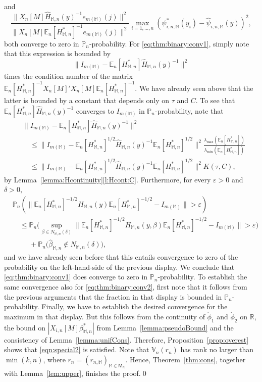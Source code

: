 \documentclass[preprint]{imsart}
\newcommand{\R}{{\mathbb R}}
\newcommand{\E}{{\mathbb E}}
\newcommand{\VC}{{\mathbb{V}}}
\renewcommand{\P}{{\mathbb P}}
\newcommand{\eps}{\varepsilon}
\newcommand{\M}{\mathbb M}
\newcommand{\lmax}{\lambda_{\max}}
\newcommand{\lmin}{\lambda_{\min}}
\numberwithin{equation}{section}
\begin{document}
and
\begin{equation}\label{eq:thm:binary:conv2}
\frac{\|X_n[M]\hat{H}_{\M,n}(y)^{-1}e_{m(\M)}(j) \|^2}{\|X_n[M]\E_n[H_{\M,n}^*]^{-1}e_{m(\M)}(j) \|^2}\max_{i=1,\dots, n} (\psi_{i,n,\M}^*(y_i) - \hat{\psi}_{i,n,\M}(y))^2,
\end{equation}
both converge to zero in $\P_n$-probability. For \eqref{eq:thm:binary:conv1}, simply note that this expression is bounded by
$$
\|I_{m(\M)} - \E_n[H_{\M,n}^*]\hat{H}_{\M,n}(y)^{-1}\|^2
$$
times the  condition number of the matrix $\E_n[H_{\M,n}^*]^{-1}X_n[M]'X_n[M]\E_n[H_{\M,n}^*]^{-1}$. We have already seen above that the latter is bounded by a constant that depends only on $\tau$ and $C$. To see that $\E_n[H_{\M,n}^*]\hat{H}_{\M,n}(y)^{-1}$ converges to $I_{m(\M)}$ in $\P_n$-probability, note that 
\begin{align*}
&\|I_{m(\M)} - \E_n[H_{\M,n}^*]\hat{H}_{\M,n}(y)^{-1}\|^2\\
&\quad\le
\|I_{m(\M)} - \E_n[H_{\M,n}^*]^{1/2}\hat{H}_{\M,n}(y)^{-1}\E_n[H_{\M,n}^*]^{1/2}\|^2 \frac{\lmax(\E_n[H_{\M,n}^*])}{\lmin(\E_n[H_{\M,n}^*])}\\
&\quad\le
\|I_{m(\M)} - \E_n[H_{\M,n}^*]^{1/2}\hat{H}_{\M,n}(y)^{-1}\E_n[H_{\M,n}^*]^{1/2}\|^2 K(\tau, C),
\end{align*}
by Lemma~\ref{lemma:Hcontinuity}\ref{l:Hcont:C}. Furthermore, for every $\eps>0$ and $\delta>0$,
\begin{align*}
&\P_n\left( \|\E_n[H_{\M,n}^*]^{-1/2}\hat{H}_{\M,n}(y)\E_n[H_{\M,n}^*]^{-1/2} - I_{m(\M)}\|>\eps\right)\\
&\quad\le
\P_n\Big( \sup_{\beta\in N_{\M,n}(\delta)}\|\E_n[H_{\M,n}^*]^{-1/2}H_{\M,n}(y,\beta)\E_n[H_{\M,n}^*]^{-1/2} - I_{m(\M)}\|>\eps\Big)\\
&\hspace{1cm} +\P_n\Big(\hat{\beta}_{\M,n} \notin N_{\M,n}(\delta)\Big),
\end{align*}
and we have already seen before that this entails convergence to zero of the probability on the left-hand-side of the previous display. We conclude that \eqref{eq:thm:binary:conv1} does converge to zero in $\P_n$-probability. To establish the same convergence also for \eqref{eq:thm:binary:conv2}, first note that it follows from the previous arguments that the fraction in that display is bounded in $\P_n$-probability. Finally, we have to establish the desired convergence for the maximum in that display. But this follows from the continuity of $\dot{\phi}_1$ and $\dot{\phi}_2$ on $\R$, the bound on $|X_{i,n}[M]\beta_{\M,n}^*|$ from Lemma~\ref{lemma:pseudoBound} and the consistency of Lemma~\ref{lemma:unifCons}. 
Therefore, Proposition~\ref{prop:overest} shows that \eqref{eqn:special2} is satisfied. Note that $\VC_n(r_n)$ has rank no larger than $\min(k,n)$, where $r_n = (r_{n,\M})_{\M\in\mathsf{M}_n}$. Hence, Theorem~\ref{thm:cons}, together with Lemma~\ref{lem:upper}, finishes the proof.\hfill\qed
\end{document}
